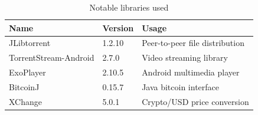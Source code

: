 \begin{table}[]
\begin{tabular}{|l|l|l|}
\hline
Name                  & Version & Usage                          \\ \hline
JLibtorrent           & 1.2.10  & Peer-to-peer file distribution \\ \hline
TorrentStream-Android & 2.7.0   & Video streaming library        \\ \hline
ExoPlayer             & 2.10.5  & Android multimedia player      \\ \hline
BitcoinJ              & 0.15.7  & Java bitcoin interface         \\ \hline
XChange               & 5.0.1   & Crypto/USD price conversion    \\ \hline
\end{tabular}
\caption{Notable libraries used}
\label{tab:library-usage}
\end{table}

